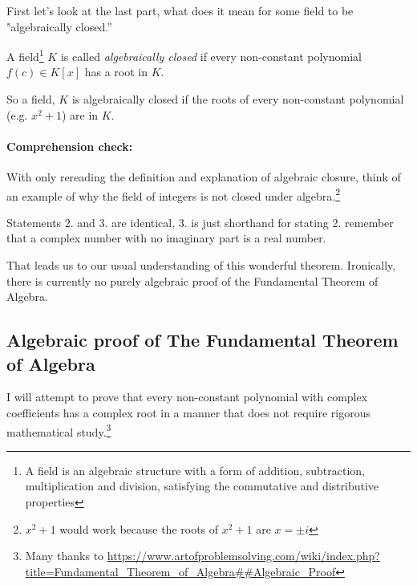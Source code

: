 \documentclass[12pt]{article}
\begin{document}
First let's look at the last part, what does it mean for some field to be "algebraically closed.''

A field\footnote{A field is an algebraic structure with a form of addition, subtraction, multiplication and division, satisfying the commutative and distributive properties} $K$ is called \emph{algebraically closed} if every non-constant polynomial $f(c) \in K[x]$ has a root in $K$.

So a field, $K$ is algebraically closed if the roots of every non-constant polynomial (e.g. $x^2+1$) are in $K$.

\paragraph*{Comprehension check:} With only rereading the definition and explanation of algebraic closure, think of an example of why the field of integers is not closed under algebra.\footnote{$x^2+1$ would work because the roots of $x^2+1$ are $x=\pm i$}

Statements 2. and 3. are identical, 3. is just shorthand for stating 2. remember that a complex number with no imaginary part is a real number.

That leads us to our usual understanding of this wonderful theorem.  Ironically, there is currently no purely algebraic proof of the Fundamental Theorem of Algebra.  

\subsection*{Algebraic proof of The Fundamental Theorem of Algebra}
I will attempt to prove that every non-constant polynomial with complex coefficients has a complex root in a manner that does not require rigorous mathematical study.\footnote{Many thanks to \url{https://www.artofproblemsolving.com/wiki/index.php?title=Fundamental_Theorem_of_Algebra##Algebraic_Proof}}\\

%
\end{document}
